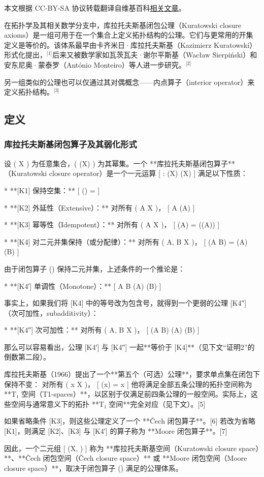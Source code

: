 
本文根据 CC-BY-SA 协议转载翻译自维基百科\href{https://en.wikipedia.org/wiki/Kuratowski_closure_axioms}{相关文章}。

在拓扑学及其相关数学分支中，库拉托夫斯基闭包公理（Kuratowski closure axioms）是一组可用于在一个集合上定义拓扑结构的公理。它们与更常用的开集定义是等价的。该体系最早由卡齐米日·库拉托夫斯基（Kazimierz Kuratowski）形式化提出，\(^\text{[1]}\)后来又被数学家如瓦茨瓦夫·谢尔平斯基（Wacław Sierpiński）和安东尼奥·蒙泰罗（António Monteiro）等人进一步研究。\(^\text{[2]}\)

另一组类似的公理也可以仅通过其对偶概念——内点算子（interior operator）来定义拓扑结构。\(^\text{[3]}\)
\subsection{定义}
\subsubsection{库拉托夫斯基闭包算子及其弱化形式}
设 ( X ) 为任意集合，( \wp(X) ) 为其幂集。一个 **库拉托夫斯基闭包算子**（Kuratowski closure operator）是一个一元运算
[
 : \wp(X) \to \wp(X)
]
满足以下性质：

* **[K1] 保持空集：**
  [
  (\varnothing) = \varnothing
  ]

* **[K2] 外延性（Extensive）：** 对所有 ( A \subseteq X )，
  [
  A \subseteq {}(A)
  ]

* **[K3] 幂等性（Idempotent）：** 对所有 ( A \subseteq X )，
  [
  (A) = ((A))
  ]

* **[K4] 对二元并集保持（或分配律）：** 对所有 ( A, B \subseteq X )，
  [
  (A \cup B) = (A) \cup {}(B)
  ]

由于闭包算子 () 保持二元并集，上述条件的一个推论是：

* **[K4′] 单调性（Monotone）：**
  [
  A \subseteq B \Rightarrow {}(A) \subseteq {}(B)
  ]

事实上，如果我们将 [K4] 中的等号改为包含号，就得到一个更弱的公理 [K4″]（次可加性，subadditivity）：

* **[K4″] 次可加性：** 对所有 ( A, B \subseteq X )，
  [
  (A \cup B) \subseteq {}(A) \cup {}(B)
  ]

那么可以容易看出，公理 [K4′] 与 [K4″] 一起**等价于 [K4]**（见下文“证明2”的倒数第二段）。

库拉托夫斯基（1966）提出了一个**第五个（可选）公理**，要求单点集在闭包下保持不变：
对所有 ( x \in X )，
[
({x}) = {x}
]
他将满足全部五条公理的拓扑空间称为 **T₁ 空间（T1-spaces）**，以区别于仅满足前四条公理的一般空间。实际上，这些空间与通常意义下的拓扑 **T₁ 空间**完全对应（见下文）。[5]

如果省略条件 [K3]，则这些公理定义了一个 **Čech 闭包算子**。[6]
若改为省略 [K1]，则满足 [K2]、[K3] 与 [K4′] 的算子称为 **Moore 闭包算子**。[7]

因此，一个二元组
[
(X, )
]
称为 **库拉托夫斯基空间（Kuratowski closure space）**、**Čech 闭包空间（Čech closure space）** 或 **Moore 闭包空间（Moore closure space）**，取决于闭包算子 () 满足的公理体系。
